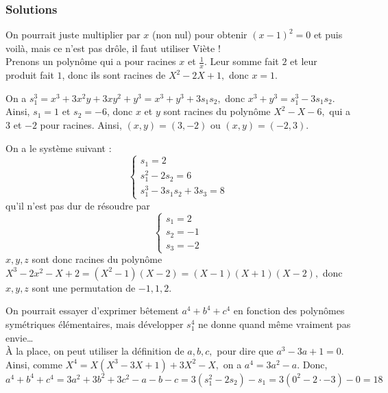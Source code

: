 \subsubsection{Solutions}


\begin{sol}
On pourrait juste multiplier par $x$ (non nul) pour obtenir $(x-1)^2=0$ et puis voilà, mais ce n'est pas drôle, il faut utiliser Viète !\\
Prenons un polynôme qui a pour racines $x$ et $\frac 1x.$ Leur somme fait $2$ et leur produit fait $1$, donc ils sont racines de $X^2-2X+1,$ donc $x=1.$
\end{sol}


\begin{sol}
On a $s_1^3=x^3+3x^2y+3xy^2+y^3=x^3+y^3+3s_1s_2,$ donc $x^3+y^3=s_1^3-3s_1s_2$. Ainsi, $s_1=1$ et $s_2=-6$, donc $x$ et $y$ sont racines du polynôme $X^2-X-6,$ qui a $3$ et $-2$ pour racines. Ainsi, $(x,y)=(3,-2)$ ou $(x,y)=(-2,3)$.
\end{sol}


\begin{sol}
On a le système suivant :
$$\begin{cases}
s_1=2\\
s_1^2-2s_2=6\\
s_1^3-3s_1s_2+3s_3=8
\end{cases}$$
qu'il n'est pas dur de résoudre par
$$\begin{cases}
s_1=2\\
s_2=-1\\
s_3=-2
\end{cases}$$
$x,y,z$ sont donc racines du polynôme $X^3-2x^2-X+2=(X^2-1)(X-2)=(X-1)(X+1)(X-2),$ donc $x,y,z$ sont une permutation de $-1,1,2$.
\end{sol}


\begin{sol}
On pourrait essayer d'exprimer bêtement $a^4+b^4+c^4$ en fonction des polynômes symétriques élémentaires, mais développer $s_1^4$ ne donne quand même vraiment pas envie…\\
À la place, on peut utiliser la définition de $a,b,c,$ pour dire que $a^3-3a+1=0$. Ainsi, comme $X^4=X(X^3-3X+1)+3X^2-X,$ on a $a^4=3a^2-a$. Donc, $$a^4+b^4+c^4=3a^2+3b^2+3c^2-a-b-c=3(s_1^2-2s_2)-s_1=3(0^2-2\cdot -3)-0=18$$
\end{sol}


